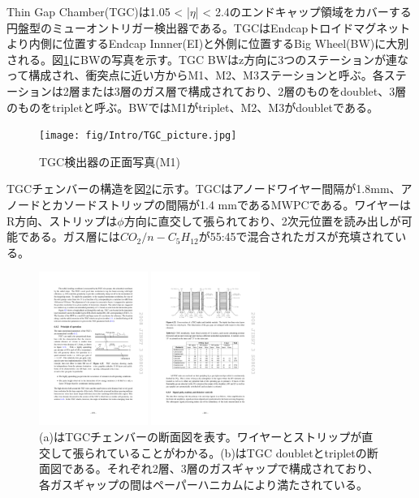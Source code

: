 Thin Gap Chamber(TGC)は1.05 < |$\eta$| < 2.4のエンドキャップ領域をカバーする円盤型のミューオントリガー検出器である。TGCはEndcapトロイドマグネットより内側に位置するEndcap Innner(EI)と外側に位置するBig Wheel(BW)に大別される。図\ref{TGC_picture}にBWの写真を示す。TGC BWはz方向に3つのステーションが連なって構成され、衝突点に近い方からM1、M2、M3ステーションと呼ぶ。各ステーションは2層または3層のガス層で構成されており、2層のものをdoublet、3層のものをtripletと呼ぶ。BWではM1がtriplet、M2、M3がdoubletである。

\begin{figure} 
\centering
\texttt{[image: fig/Intro/TGC\_picture.jpg]}
\caption[TGC検出器]{TGC検出器の正面写真(M1)\cite{cern_document_server}}
\label{TGC_picture}
\end{figure}

TGCチェンバーの構造を図\ref{TGC_structure}に示す。TGCはアノードワイヤー間隔が1.8mm、アノードとカソードストリップの間隔が1.4 mmであるMWPCである。ワイヤーはR方向、ストリップは$\phi$方向に直交して張られており、2次元位置を読み出しが可能である。ガス層には$CO_2/n-C_5H_{12}$が55:45で混合されたガスが充填されている。

\begin{figure}
\begin{minipage}[b]{.5\linewidth}
\centering
\includegraphics[height=5cm]{fig/Intro/TGC_structure.pdf}
\end{minipage}%
\begin{minipage}[b]{.5\linewidth}
\centering
\includegraphics[height=5cm]{fig/Intro/TGC_crosssection.pdf}
\end{minipage}%
\caption[TGCチェンバーの断面図]{(a)はTGCチェンバーの断面図を表す\cite{JINST:2008}。ワイヤーとストリップが直交して張られていることがわかる。(b)はTGC doubletとtripletの断面図である。それぞれ2層、3層のガスギャップで構成されており、各ガスギャップの間はペーパーハニカムにより満たされている。}
\label{TGC_structure}
\end{figure}


